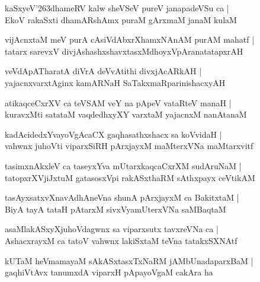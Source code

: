 \documentclass[twoside,12pt,openright]{book}
\def\S{\char'263}
\newcounter{shloka}[chapter]
\begin{document}
\begin{shloka}%
kaSxyeV\S dhameRV kalw sheVSeV pureV janapadeVSu ca |\\
EkoV rakaSxti dhamARshAmx puraM gArxmaM janaM kulaM 
\end{shloka}

\begin{shloka}%
vijAcnxtaM meV purA cAsiVdAbxrXhamxNAnAM purAM mahatf |\\
tatarx sarevxV divjAshashxshavxtasxMdhoyxVpAranatatapxrAH 
\end{shloka}

\begin{shloka}%
veVdApATharatA diVrA deVvAtithi divxjAcARkAH |\\
yajacnxvarxtAginx kamARNaH SaTakxmaRparinishacxyAH 
\end{shloka}

\begin{shloka}%
atikaqceCxrXV ca teVSAM veY na pApeV vataRteV manaH |\\
kuravxMti satataM vaqdedhxyXY varxtaM yajacnxM nanAtanaM 
\end{shloka}

\begin{shloka}%
kadAcidedxYvayoVgAcaCX gaqhasathxshacx sa koVvidaH |\\
vahwnx juhoVti viparxSiRH pArxjayxM maMterxVNa maMtarxvitf
\end{shloka}

\begin{shloka}%
tasimxnAkxleV ca taseyxYva mUtarxkaqcaCxrXM sudAruNaM |\\
tatopxrXVjiJxtuM gatasosxVpi rakASxthaRM sAthxpayx ceVtikAM 
\end{shloka}

\begin{shloka}%
tasAyxsatxvXnavAdhAneVna shunA pArxjayxM ca BakitxtaM |\\
BiyA tayA tataH pAtarxM sivxVyamUterxVNa saMBaqtaM 
\end{shloka}

\begin{shloka}%
asaMlakASxyXjuhoVdagwnx sa viparxsutx tavxreVNa ca |\\
AshacxrayxM ca tatoV vahwnx lakiSxtaM teVna tatakxSXNAtf
\end{shloka}

\begin{shloka}%
kUTaM heVmamayaM sAkASxtasxTxNaRM jAMbUnadaparxBaM |\\
gaqhiVtAvx tanumxdA viparxH pApayoVgaM cakAra ha 
\end{shloka}
\end{document}
